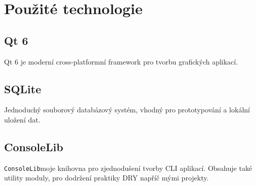 
\section{Použité technologie}

\subsection{Qt 6}
Qt 6 je moderní cross-platformní framework pro tvorbu grafických aplikací. 

\subsection{SQLite}
Jednoduchý souborový databázový systém, vhodný pro prototypování a lokální uložení dat.

\subsection{ConsoleLib}
\texttt{ConsoleLib}moje knihovna pro zjednodušení tvorby CLI aplikací. Obsahuje také utility moduly, pro dodržení praktiky DRY napříč mými projekty.


